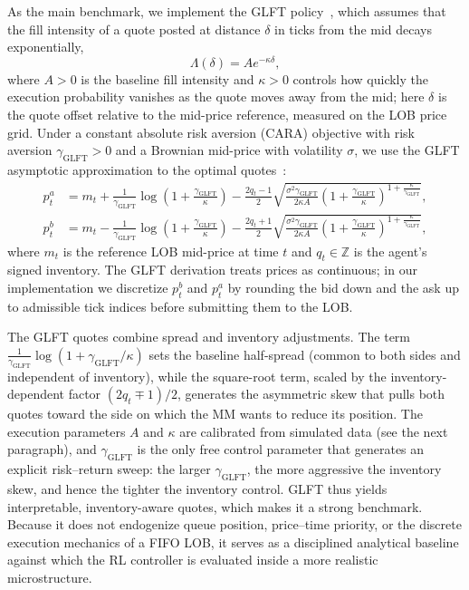 \documentclass[11pt,a4paper]{article}
\begin{document}
As the main benchmark, we implement the GLFT
policy~\citep{gueant2013dealing}, which 
 assumes that the fill intensity of a quote posted
at distance \(\delta\) in ticks from the mid decays exponentially,
\begin{equation}\label{eq:Lambda}
  \Lambda(\delta)=A e^{-\kappa \delta},
\end{equation}
where \(A>0\) is the baseline fill intensity and \(\kappa>0\) controls
how quickly the execution probability vanishes as the quote moves away
from the mid; here \(\delta\) is the quote offset relative to the
 mid-price reference, measured on the LOB price grid.  Under a constant
absolute risk aversion (CARA) objective with risk aversion
\(\gamma_{\mathrm{GLFT}} > 0\) and a Brownian mid-price with volatility
\(\sigma\), we use the GLFT asymptotic approximation to the optimal
quotes~\citep{gueant2013dealing}:
\begin{align}
  p_t^{a}
  &= m_t
  + \frac{1}{\gamma_{\mathrm{GLFT}}}\log\!\left(1 + \frac{\gamma_{\mathrm{GLFT}}}{\kappa}\right)
  - \frac{2 q_t - 1}{2}
    \sqrt{\frac{\sigma^2\gamma_{\mathrm{GLFT}}}{2\kappa A}
      \left(1 + \frac{\gamma_{\mathrm{GLFT}}}{\kappa}\right)^{\!1+\frac{\kappa}{\gamma_{\mathrm{GLFT}}}}},
  \label{eq:glft_ask}\\[4pt]
  p_t^{b}
  &= m_t
  - \frac{1}{\gamma_{\mathrm{GLFT}}}\log\!\left(1 + \frac{\gamma_{\mathrm{GLFT}}}{\kappa}\right)
  - \frac{2 q_t + 1}{2}
    \sqrt{\frac{\sigma^2\gamma_{\mathrm{GLFT}}}{2\kappa A}
      \left(1 + \frac{\gamma_{\mathrm{GLFT}}}{\kappa}\right)^{\!1+\frac{\kappa}{\gamma_{\mathrm{GLFT}}}}},
  \label{eq:glft_bid}
\end{align}
where \(m_t\) is the reference LOB mid-price at time \(t\) and
\(q_t\in\mathbb{Z}\) is the agent's signed inventory.  The GLFT
derivation treats prices as continuous; in our implementation we
discretize $p_t^{b}$ and $p_t^{a}$ by rounding the bid down and the
ask up to admissible tick indices before submitting them to the LOB.

The GLFT quotes combine spread and inventory adjustments.
The term $\tfrac{1}{\gamma_{\mathrm{GLFT}}}\log(1+\gamma_{\mathrm{GLFT}}/\kappa)$
sets the baseline half-spread (common to both sides and independent
of inventory), while the square-root term, scaled by the
inventory-dependent factor $(2q_t \mp 1)/2$, generates the
asymmetric skew that pulls both quotes toward the side on which the
MM wants to reduce its position.  The execution parameters
\(A\) and \(\kappa\) are calibrated from simulated data (see the next paragraph), and \(\gamma_{\mathrm{GLFT}}\) is the only
free control parameter that generates an explicit risk--return sweep: the larger
$\gamma_{\mathrm{GLFT}}$, the more aggressive the inventory skew, and hence the tighter
the inventory control.
GLFT thus yields interpretable, inventory-aware quotes, which makes it
a strong benchmark.  Because it does not endogenize queue position,
price--time priority, or the discrete execution mechanics of a FIFO
LOB, it serves as a disciplined analytical baseline against which the
RL controller is evaluated inside a more realistic microstructure.
\end{document}
